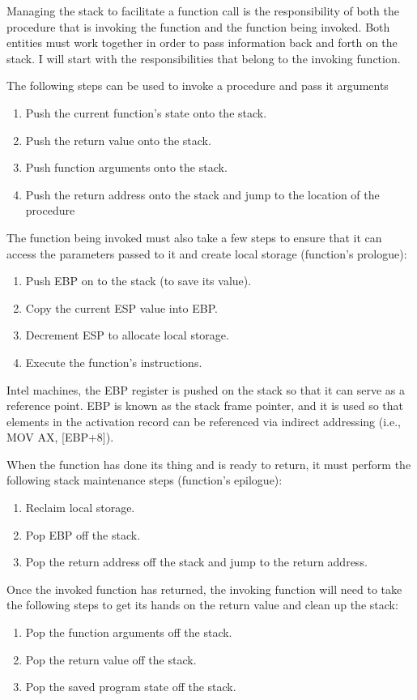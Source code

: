 \documentclass{report}
\begin{document}
Managing the stack to facilitate a function call is the responsibility of both the procedure that is invoking the function and the function being invoked. Both entities must work together in order to pass information back and forth on the stack. I will start with the responsibilities that belong to the invoking function.

The following steps can be used to invoke a procedure and pass it arguments
\begin{enumerate}
\item Push the current function's state onto the stack.
\item Push the return value onto the stack.
\item Push function arguments onto the stack.
\item Push the return address onto the stack and jump to the location of the procedure
\end{enumerate}

The function being invoked must also take a few steps to ensure that it can access the parameters passed to it and create local storage (function's prologue):
\begin{enumerate}
\item Push EBP on to the stack (to save its value).
\item Copy the current ESP value into EBP.
\item Decrement ESP to allocate local storage.
\item Execute the function's instructions.
\end{enumerate}

Intel machines, the EBP register is pushed on the stack so that it can serve as a reference point. EBP is known as the stack frame pointer, and it is used so that elements in the activation record can be referenced via indirect addressing (i.e., MOV AX, [EBP+8]).

When the function has done its thing and is ready to return, it must perform the following stack maintenance steps (function's epilogue):
\begin{enumerate}
\item Reclaim local storage.
\item Pop EBP off the stack.
\item Pop the return address off the stack and jump to the return address.
\end{enumerate}

Once the invoked function has returned, the invoking function will need to take the following steps to get its hands on the return value and clean up the stack:
\begin{enumerate}
\item Pop the function arguments off the stack.
\item Pop the return value off the stack.
\item Pop the saved program state off the stack.
\end{enumerate}
\end{document}
